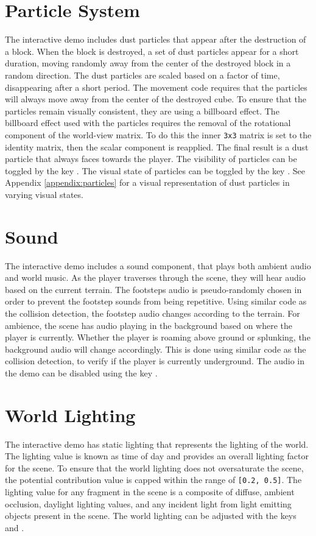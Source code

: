 \documentclass{book}
\begin{document}
\section{Particle System}
The interactive demo includes dust particles that appear after the destruction of a block.  When the block is destroyed, a set of dust particles appear for a short duration, moving randomly away from the center of the destroyed block in a random direction.  The dust particles are scaled based on a factor of time, disappearing after a short period.  The movement code requires that the particles will always move away from the center of the destroyed cube.  To ensure that the particles remain visually consistent, they are using a billboard effect.  The billboard effect used with the particles requires the removal of the rotational component of the world-view matrix.  To do this the inner \texttt{3x3} matrix is set to the identity matrix, then the scalar component is reapplied.  The final result is a dust particle that always faces towards the player.
\vskip 2.5mm\noindent
The visibility of particles can be toggled by the key .  The visual state of particles can be toggled by the key .  See Appendix \ref{appendix:particles} for a visual representation of dust particles in varying visual states.

\section{Sound}
The interactive demo includes a sound component, that plays both ambient audio and world music.  As the player traverses through the scene, they will hear audio based on the current terrain.  The footsteps audio is pseudo-randomly chosen in order to prevent the footstep sounds from being repetitive.  Using similar code as the collision detection, the footstep audio changes according to the terrain.  For ambience, the scene has audio playing in the background based on where the player is currently.  Whether the player is roaming above ground or splunking, the background audio will change accordingly.  This is done using similar code as the collision detection, to verify if the player is currently underground.
\vskip 2.5mm\noindent
The audio in the demo can be disabled using the key .
    
\section{World Lighting}
The interactive demo has static lighting that represents the lighting of the world.  The lighting value is known as time of day and provides an overall lighting factor for the scene.  To ensure that the world lighting does not oversaturate the scene, the potential contribution value is capped within the range of \texttt{[0.2, 0.5]}.  The lighting value for any fragment in the scene is a composite of diffuse, ambient occlusion, daylight lighting values, and any incident light from light emitting objects present in the scene.
\vskip 2.5mm\noindent
The world lighting can be adjusted with the keys  and .
    
\end{document}
